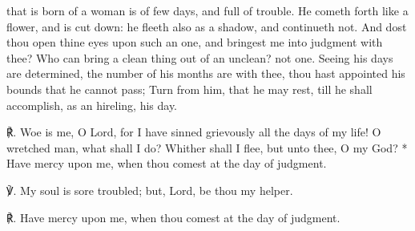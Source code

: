  that is born of a woman is of few days, and full of trouble. He cometh forth like a flower, and is cut down: he fleeth also as a shadow, and continueth not. And dost thou open thine eyes upon such an one, and bringest me into judgment with thee? Who can bring a clean thing out of an unclean? not one. Seeing his days are determined, the number of his months are with thee, thou hast appointed his bounds that he cannot pass; Turn from him, that he may rest, till he shall accomplish, as an hireling, his day.\par
℟. Woe is me, {\dag} O Lord, for I have sinned grievously all the days of my life! O wretched man, what shall I do? Whither shall I flee, but unto thee, O my God? * Have mercy upon me, when thou comest at the day of judgment.\par
℣. My soul is sore troubled; but, Lord, be thou my helper.\par
℟. Have mercy upon me, when thou comest at the day of judgment.

